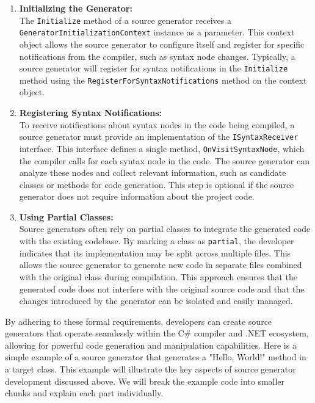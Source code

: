 \begin{enumerate}
\item \textbf{Initializing the Generator:}\\
The \texttt{Initialize} method of a source generator receives a \texttt{GeneratorInitializationContext} instance as a parameter. This context object allows the source generator to configure itself and register for specific notifications from the compiler, such as syntax node changes. Typically, a source generator will register for syntax notifications in the \texttt{Initialize} method using the \texttt{RegisterForSyntaxNotifications} method on the context object.

\item \textbf{Registering Syntax Notifications:}\\
To receive notifications about syntax nodes in the code being compiled, a source generator must provide an implementation of the \texttt{ISyntaxReceiver} interface. This interface defines a single method, \texttt{OnVisitSyntaxNode}, which the compiler calls for each syntax node in the code. The source generator can analyze these nodes and collect relevant information, such as candidate classes or methods for code generation. This step is optional if the source generator does not require information about the project code.

\item \textbf{Using Partial Classes:}\\
Source generators often rely on partial classes to integrate the generated code with the existing codebase. By marking a class as \texttt{partial}, the developer indicates that its implementation may be split across multiple files. This allows the source generator to generate new code in separate files combined with the original class during compilation. This approach ensures that the generated code does not interfere with the original source code and that the changes introduced by the generator can be isolated and easily managed.

\end{enumerate}

By adhering to these formal requirements, developers can create source generators that operate seamlessly within the C\# compiler and .NET ecosystem, allowing for powerful code generation and manipulation capabilities. Here is a simple example of a source generator that generates a "Hello, World!" method in a target class. This example will illustrate the key aspects of source generator development discussed above. We will break the example code into smaller chunks and explain each part individually.

